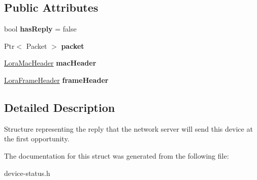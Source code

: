 \subsection*{Public Attributes}
\begin{DoxyCompactItemize}
\item 
\mbox{\label{structns3_1_1lorawan_1_1DeviceStatus_1_1Reply_ad8f201939e035e1590b08671eac3bcda}} 
bool {\bfseries has\+Reply} = false
\item 
\mbox{\label{structns3_1_1lorawan_1_1DeviceStatus_1_1Reply_a0f46dfa7b3ecc07429739e9253afad8e}} 
Ptr$<$ Packet $>$ {\bfseries packet}
\item 
\mbox{\label{structns3_1_1lorawan_1_1DeviceStatus_1_1Reply_adec7c1d09ccbaebaef7103783a3efac4}} 
\hyperlink{classns3_1_1lorawan_1_1LoraMacHeader}{Lora\+Mac\+Header} {\bfseries mac\+Header}
\item 
\mbox{\label{structns3_1_1lorawan_1_1DeviceStatus_1_1Reply_af2b5d00d0963dedc9799d331e45b15b2}} 
\hyperlink{classns3_1_1lorawan_1_1LoraFrameHeader}{Lora\+Frame\+Header} {\bfseries frame\+Header}
\end{DoxyCompactItemize}


\subsection{Detailed Description}
Structure representing the reply that the network server will send this device at the first opportunity. 

The documentation for this struct was generated from the following file\+:\begin{DoxyCompactItemize}
\item 
device-\/status.\+h\end{DoxyCompactItemize}
